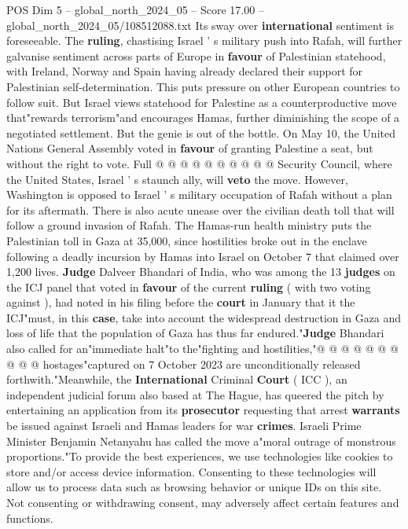 \begin{textsample}{POS Dim 5 – global\_north\_2024\_05 – Score 17.00 – global\_north\_2024\_05/108512088.txt}
Its sway over \textbf{international} sentiment is foreseeable.
The \textbf{ruling}, chastising Israel ' s military push into Rafah, will further galvanise sentiment across parts of Europe in \textbf{favour} of Palestinian statehood, with Ireland, Norway and Spain having already declared their support for Palestinian self-determination.
This puts pressure on other European countries to follow suit.
But Israel views statehood for Palestine as a counterproductive move that"rewards terrorism"and encourages Hamas, further diminishing the scope of a negotiated settlement.
But the genie is out of the bottle.
On May 10, the United Nations General Assembly voted in \textbf{favour} of granting Palestine a seat, but without the right to vote.
Full @ @ @ @ @ @ @ @ @ @ Security Council, where the United States, Israel ' s staunch ally, will \textbf{veto} the move.
However, Washington is opposed to Israel ' s military occupation of Rafah without a plan for its aftermath.
There is also acute unease over the civilian death toll that will follow a ground invasion of Rafah.
The Hamas-run health ministry puts the Palestinian toll in Gaza at 35,000, since hostilities broke out in the enclave following a deadly incursion by Hamas into Israel on October 7 that claimed over 1,200 lives. \textbf{Judge} Dalveer Bhandari of India, who was among the 13 \textbf{judges} on the ICJ panel that voted in \textbf{favour} of the current \textbf{ruling} ( with two voting against ), had noted in his filing before the \textbf{court} in January that it the ICJ"must, in this \textbf{case}, take into account the widespread destruction in Gaza and loss of life that the population of Gaza has thus far endured."\textbf{Judge} Bhandari also called for an"immediate halt"to the"fighting and hostilities,"@ @ @ @ @ @ @ @ @ @ hostages"captured on 7 October 2023 are unconditionally released forthwith."Meanwhile, the \textbf{International} Criminal \textbf{Court} ( ICC ), an independent judicial forum also based at The Hague, has queered the pitch by entertaining an application from its \textbf{prosecutor} requesting that arrest \textbf{warrants} be issued against Israeli and Hamas leaders for war \textbf{crimes}.
Israeli Prime Minister Benjamin Netanyahu has called the move a"moral outrage of monstrous proportions."To provide the best experiences, we use technologies like cookies to store and/or access device information.
Consenting to these technologies will allow us to process data such as browsing behavior or unique IDs on this site.
Not consenting or withdrawing consent, may adversely affect certain features and functions.

\end{textsample}
